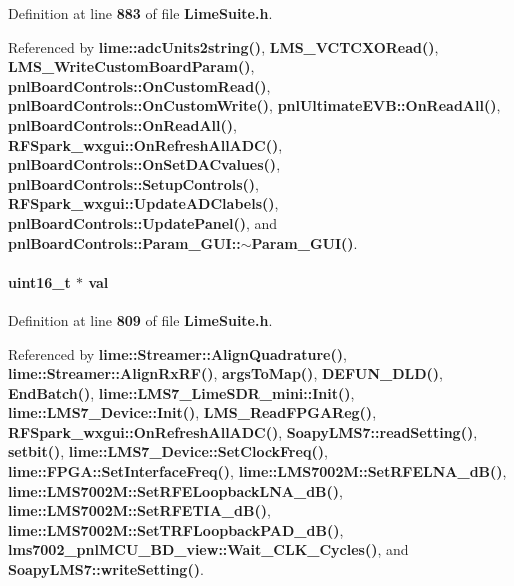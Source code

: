 Definition at line {\bf 883} of file {\bf Lime\+Suite.\+h}.



Referenced by {\bf lime\+::adc\+Units2string()}, {\bf L\+M\+S\+\_\+\+V\+C\+T\+C\+X\+O\+Read()}, {\bf L\+M\+S\+\_\+\+Write\+Custom\+Board\+Param()}, {\bf pnl\+Board\+Controls\+::\+On\+Custom\+Read()}, {\bf pnl\+Board\+Controls\+::\+On\+Custom\+Write()}, {\bf pnl\+Ultimate\+E\+V\+B\+::\+On\+Read\+All()}, {\bf pnl\+Board\+Controls\+::\+On\+Read\+All()}, {\bf R\+F\+Spark\+\_\+wxgui\+::\+On\+Refresh\+All\+A\+D\+C()}, {\bf pnl\+Board\+Controls\+::\+On\+Set\+D\+A\+Cvalues()}, {\bf pnl\+Board\+Controls\+::\+Setup\+Controls()}, {\bf R\+F\+Spark\+\_\+wxgui\+::\+Update\+A\+D\+Clabels()}, {\bf pnl\+Board\+Controls\+::\+Update\+Panel()}, and {\bf pnl\+Board\+Controls\+::\+Param\+\_\+\+G\+U\+I\+::$\sim$\+Param\+\_\+\+G\+U\+I()}.

\paragraph[{val}]{\setlength{\rightskip}{0pt plus 5cm}uint16\+\_\+t $\ast$ val}\label{group__FN__LOW__LVL_gaa4f209c056c387c044201ffd5e668ffa}


Definition at line {\bf 809} of file {\bf Lime\+Suite.\+h}.



Referenced by {\bf lime\+::\+Streamer\+::\+Align\+Quadrature()}, {\bf lime\+::\+Streamer\+::\+Align\+Rx\+R\+F()}, {\bf args\+To\+Map()}, {\bf D\+E\+F\+U\+N\+\_\+\+D\+L\+D()}, {\bf End\+Batch()}, {\bf lime\+::\+L\+M\+S7\+\_\+\+Lime\+S\+D\+R\+\_\+mini\+::\+Init()}, {\bf lime\+::\+L\+M\+S7\+\_\+\+Device\+::\+Init()}, {\bf L\+M\+S\+\_\+\+Read\+F\+P\+G\+A\+Reg()}, {\bf R\+F\+Spark\+\_\+wxgui\+::\+On\+Refresh\+All\+A\+D\+C()}, {\bf Soapy\+L\+M\+S7\+::read\+Setting()}, {\bf setbit()}, {\bf lime\+::\+L\+M\+S7\+\_\+\+Device\+::\+Set\+Clock\+Freq()}, {\bf lime\+::\+F\+P\+G\+A\+::\+Set\+Interface\+Freq()}, {\bf lime\+::\+L\+M\+S7002\+M\+::\+Set\+R\+F\+E\+L\+N\+A\+\_\+d\+B()}, {\bf lime\+::\+L\+M\+S7002\+M\+::\+Set\+R\+F\+E\+Loopback\+L\+N\+A\+\_\+d\+B()}, {\bf lime\+::\+L\+M\+S7002\+M\+::\+Set\+R\+F\+E\+T\+I\+A\+\_\+d\+B()}, {\bf lime\+::\+L\+M\+S7002\+M\+::\+Set\+T\+R\+F\+Loopback\+P\+A\+D\+\_\+d\+B()}, {\bf lms7002\+\_\+pnl\+M\+C\+U\+\_\+\+B\+D\+\_\+view\+::\+Wait\+\_\+\+C\+L\+K\+\_\+\+Cycles()}, and {\bf Soapy\+L\+M\+S7\+::write\+Setting()}.


